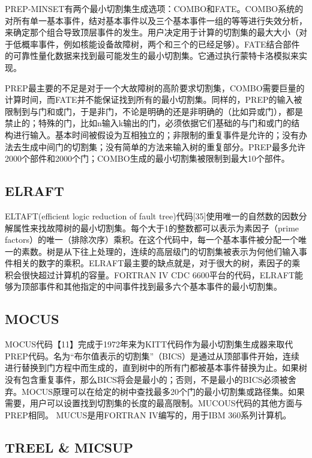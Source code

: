\documentclass[cn,11pt,chinese]{elegantbook}
\begin{document}
{PREP-MINSET有两个最小切割集生成选项：COMBO和FATE。COMBO系统的对所有单一基本事件，结对基本事件以及三个基本事件一组的等等进行失效分析，来确定那个组合导致顶层事件的发生。用户决定用于计算的切割集的最大大小（对于低概率事件，例如核能设备故障树，两个和三个的已经足够）。FATE结合部件的可靠性量化数据来找到最可能发生的最小切割集。它通过执行蒙特卡洛模拟来实现。

PREP最主要的不足是对于一个大故障树的高阶要求切割集，COMBO需要巨量的计算时间，而FATE并不能保证找到所有的最小切割集。同样的，PREP的输入被限制到与门和或门，于是非门，不论是明确的还是非明确的（比如异或门），都是禁止的；特殊的门，比如n输入k输出的门，必须依据它们基础的与门和或门的结构进行输入。基本时间被假设为互相独立的；非限制的重复事件是允许的；没有办法去生成中间门的切割集；没有简单的方法来输入树的重复部分。PREP最多允许2000个部件和2000个门；COMBO生成的最小切割集被限制到最大10个部件。

\subsection{ELRAFT}

ELTAFT(efficient logic reduction of fault tree)代码[35]使用唯一的自然数的因数分解属性来找故障树的最小切割集。每个大于1的整数都可以表示为素因子（prime factors）的唯一（排除次序）乘积。在这个代码中，每一个基本事件被分配一个唯一的素数。树是从下往上处理的，连续的高层级门的切割集被表示为何他们输入事件相关的数字的乘积。ELRAFT最主要的缺点就是，对于很大的树，素因子的乘积会很快超过计算机的容量。FORTRAN IV CDC 6600平台的代码，ELRAFT能够为顶部事件和其他指定的中间事件找到最多六个基本事件的最小切割集。

\subsection{MOCUS}

MOCUS代码【11】完成于1972年来为KITT代码作为最小切割集生成器来取代PREP代码。名为“布尔值表示的切割集”（BICS）是通过从顶部事件开始，连续进行替换到门方程中而生成的，直到树中的所有门都被基本事件替换为止。如果树没有包含重复事件，那么BICS将会是最小的；否则，不是最小的BICS必须被舍弃。MOCUS原理可以在给定的树中查找最多20个门的最小切割集或路径集。如果需要，用户可以设置找到切割集的长度的最高限制。MUCOUS代码的其他方面与PREP相同。 MUCUS是用FORTRAN IV编写的，用于IBM 360系列计算机。

\subsection{TREEL \& MICSUP}

}
\end{document}
